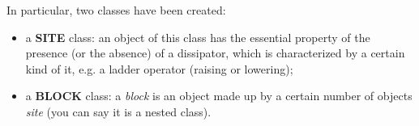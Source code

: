 In particular, two classes have been created:
\begin{itemize}
    \item a \textbf{SITE} class: an object of this class has the essential property of the presence (or the absence) of a dissipator, which is characterized by a certain kind of it, e.g. a ladder operator (raising or lowering);
    \item a \textbf{BLOCK} class: a \emph{block} is an object made up by a certain number of objects \emph{site} (you can say it is a nested class).
\end{itemize}

